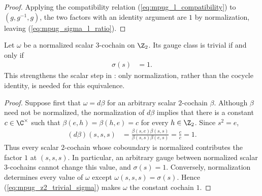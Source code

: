 \begin{proof}\leanok
    Applying the compatibility relation
    (\ref{eq:mpug_l_compatibility}) to $(g,g^{-1},g)$, the two factors with an
    identity argument are $1$ by normalization, leaving
    (\ref{eq:mpug_sigma_l_ratio}).
\end{proof}

\begin{lemma}
    \label{thm:mpug_z2_trivial_scalar_class}
    \leanok
    Let $\omega$ be a normalized scalar $3$-cochain on $\Z_2$. Its gauge
    class is trivial if and only if
    \begin{align}
        \sigma(s) & =1.
        \label{eq:mpug_z2_trivial_sigma}
    \end{align}
    This strengthens the scalar step in
    \cite[lines~5339--5341]{FrancoRubio2025MPUGauging}: only normalization,
    rather than the cocycle identity, is needed for this equivalence.
\end{lemma}

\begin{proof}\leanok
    Suppose first that $\omega=d\beta$ for an arbitrary scalar $2$-cochain
    $\beta$. Although $\beta$ need not be normalized, the normalization of
    $d\beta$ implies that there is a constant $c\in\C^\times$ such that
    $\beta(e,h)=\beta(h,e)=c$ for every $h\in\Z_2$. Since $s^2=e$,
    \begin{align}
        (d\beta)(s,s,s)
         & =\frac{\beta(s,e)\beta(s,s)}
        {\beta(s,s)\beta(e,s)}=\frac{c}{c}=1.
        \label{eq:mpug_z2_coboundary_generator}
    \end{align}
    Thus every scalar $2$-cochain whose coboundary is normalized contributes
    the factor $1$ at $(s,s,s)$. In particular, an arbitrary gauge between
    normalized scalar $3$-cochains cannot change this value, and
    $\sigma(s)=1$. Conversely, normalization determines every
    value of $\omega$ except $\omega(s,s,s)=\sigma(s)$. Hence
    (\ref{eq:mpug_z2_trivial_sigma}) makes $\omega$ the constant cochain $1$.
\end{proof}


